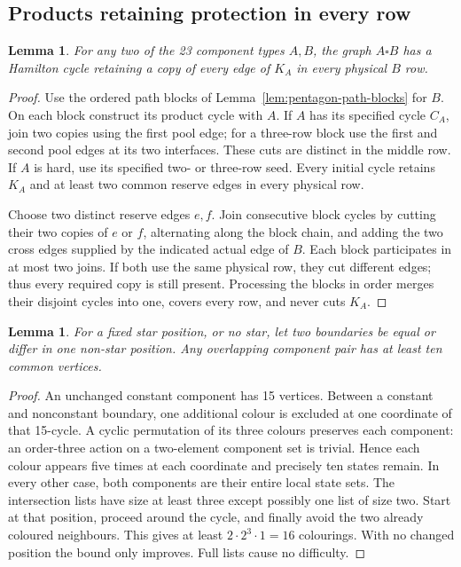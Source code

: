 \documentclass[11pt]{article}
\newtheorem{lemma}[theorem]{Lemma}
\theoremstyle{remark}
\numberwithin{equation}{section}
\numberwithin{table}{section}
\begin{document}
\subsection{Products retaining protection in every row}
\begin{lemma}\label{lem:protected-product}
For any two of the 23 component types $A,B$, the graph $A\square B$
has a Hamilton cycle retaining a copy of every edge of $K_A$
in every physical $B$ row.
\end{lemma}
\begin{proof}
Use the ordered path blocks of Lemma~\ref{lem:pentagon-path-blocks}
for $B$. On each block construct its product cycle with $A$.
If $A$ has its specified cycle $C_A$, join two copies using the
first pool edge; for a three-row block use the first and second
pool edges at its two interfaces. These cuts are distinct in the
middle row. If $A$ is hard, use its specified two- or three-row seed.
Every initial cycle retains $K_A$ and at least two common reserve
edges in every physical row.

Choose two distinct reserve edges $e,f$. Join consecutive block
cycles by cutting their two copies of $e$ or $f$, alternating along
the block chain, and adding the two cross edges supplied by the
indicated actual edge of $B$. Each block participates in at most two
joins. If both use the same physical row, they cut different edges;
thus every required copy is still present. Processing the blocks in
order merges their disjoint cycles into one, covers every row, and
never cuts $K_A$.
\end{proof}

\begin{lemma}\label{lem:pentagon-overlap}
For a fixed star position, or no star, let two boundaries be equal or
differ in one non-star position. Any overlapping component pair has
at least ten common vertices.
\end{lemma}
\begin{proof}
An unchanged constant component has 15 vertices. Between a constant
and nonconstant boundary, one additional colour is excluded at one
coordinate of that 15-cycle. A cyclic permutation of its three colours
preserves each component: an order-three action on a two-element
component set is trivial. Hence each colour appears five times at
each coordinate and precisely ten states remain.
In every other case, both components are their entire local state
sets. The intersection lists have size at least three except possibly
one list of size two. Start at that position, proceed around the
cycle, and finally avoid the two already coloured neighbours.
This gives at least $2\cdot2^3\cdot1=16$ colourings. With no changed
position the bound only improves. Full lists cause no difficulty.
\end{proof}
\end{document}
